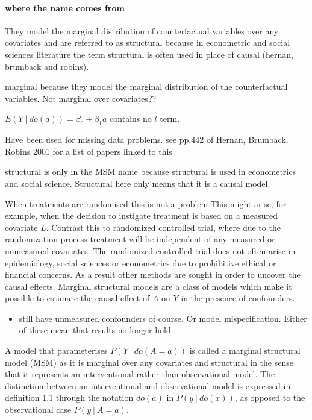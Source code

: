 \documentclass[11pt]{article}
\providecommand{\tightlist}{%
      \setlength{\itemsep}{0pt}\setlength{\parskip}{0pt}}
\begin{document}
\paragraph{where the name comes from}\label{where-the-name-comes-from}

They model the marginal distribution of counterfactual variables over
any covariates and are referred to as structural because in econometric
and social sciences literature the term structural is often used in
place of causal (hernan, brumback and robins).

marginal because they model the marginal distribution of the
counterfactual variables. Not marginal over covariates??

\(E(Y\ |\ do(a)) = \beta_0 + \beta_1a\) contains no \(l\) term.

Have been used for missing data problems. see pp.442 of Hernan,
Brumback, Robins 2001 for a list of papers linked to this

structural is only in the MSM name because structural is used in
econometrics and social science. Structural here only means that it is a
causal model.

When treatments are randomised this is not a problem This might arise,
for example, when the decision to instigate treatment is based on a
measured covariate \(L\). Contrast this to randomized controlled trial,
where due to the randomization process treatment will be independent of
any measured or unmeasured covariates. The randomized controlled trial
does not often arise in epidemiology, social sciences or econometrics
due to prohibitive ethical or financial concerns. As a result other
methods are sought in order to uncover the causal effects. Marginal
structural models are a class of models which make it possible to
estimate the causal effect of \(A\) on \(Y\) in the presence of
confounders.

\begin{itemize}
\tightlist
\item
  still have unmeasured confounders of course. Or model mispecification.
  Either of these mean that results no longer hold.
\end{itemize}

A model that parameterises \(P(Y\ |\ do(A=a))\) is called a marginal
structural model (MSM) as it is marginal over any covariates and
structural in the sense that it represents an interventional rather than
observational model. The distinction between an interventional and
observational model is expressed in definition 1.1 through the notation
\(do(a)\) in \(P(y\ |\ do(x))\), as opposed to the observational case
\(P(y\ |\ A=a)\).
\end{document}

